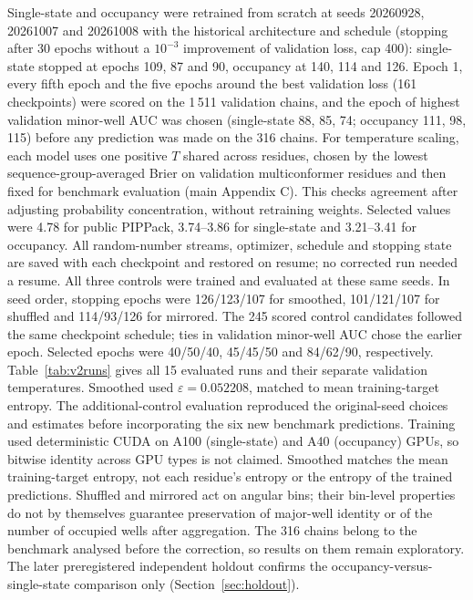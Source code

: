 \documentclass[10pt,a4paper]{article}
\begin{document}
Single-state and occupancy were retrained from scratch at seeds 20260928, 20261007 and
20261008 with the historical architecture and schedule (stopping after 30 epochs
without a $10^{-3}$ improvement of validation loss, cap 400): single-state stopped at
epochs 109, 87 and 90, occupancy at 140, 114 and 126. Epoch 1, every fifth epoch and the
five epochs around the best validation loss (161 checkpoints) were scored on the 1\,511
validation chains, and the epoch of highest validation minor-well AUC was chosen
(single-state 88, 85, 74; occupancy 111, 98, 115) before any prediction was made on the
316 chains. For temperature scaling, each model uses one positive $T$ shared across residues, chosen by the lowest sequence-group-averaged Brier on validation multiconformer residues and then fixed for benchmark evaluation (main Appendix C). This checks agreement after adjusting probability concentration, without retraining weights. Selected values were 4.78 for public PIPPack, 3.74--3.86 for single-state and 3.21--3.41 for occupancy. All random-number
streams, optimizer, schedule and stopping state are saved with each checkpoint and
restored on resume; no corrected run needed a resume. All three controls were trained and evaluated at these same seeds. In seed order, stopping epochs were 126/123/107 for smoothed, 101/121/107 for shuffled and 114/93/126 for mirrored. The 245 scored control candidates followed the same checkpoint schedule; ties in validation minor-well AUC chose the earlier epoch. Selected epochs were 40/50/40, 45/45/50 and 84/62/90, respectively. Table~\ref{tab:v2runs} gives all 15 evaluated runs and their separate validation temperatures. Smoothed used $\varepsilon=0.052208$, matched to mean training-target entropy. The additional-control evaluation reproduced the original-seed choices and estimates before incorporating the six new benchmark predictions. Training used deterministic CUDA
on A100 (single-state) and A40 (occupancy) GPUs, so bitwise identity across GPU types
is not claimed. Smoothed matches the mean training-target entropy, not each
residue's entropy or the entropy of the trained predictions. Shuffled and mirrored
act on angular bins; their bin-level properties do not by themselves guarantee
preservation of major-well identity or of the number of occupied wells after
aggregation. The 316 chains belong to the benchmark analysed before the correction,
so results on them remain exploratory. The later preregistered independent holdout
confirms the occupancy-versus-single-state comparison only (Section~\ref{sec:holdout}).
\end{document}
